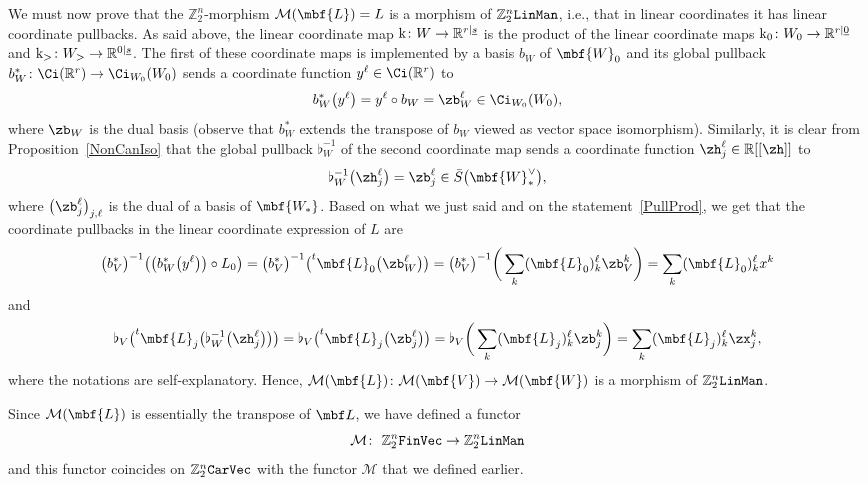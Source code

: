 \documentclass[10pt,a4paper]{amsart}
\newcommand{\rmk}{\textnormal{k}}
\newcommand{\R}{{\mathbb R}}
\newcommand{\Z}{{\mathbb Z}}
\def\ul{\underline}
\def\cM{\cal M}
\def\cM{\mathcal{M}}
\def\ul{\underline}
\newcommand{\0}{\otimes}
\numberwithin{equation}{section}
\providecommand{\cal}{\mathcal}
\begin{document}
We must now prove that the $\Z_2^n$-morphism $\cM(\mbf{L})=L$ is a morphism of $\Z_2^n\tt LinMan$, i.e., that in linear coordinates it has linear coordinate pullbacks. As said above, the linear coordinate map $\rmk\colon W\to\R^{r|\ul s}$ is the product of the linear coordinate maps $\rmk_0\colon W_0\to \R^{r|\ul 0}$ and $\rmk_>\colon W_>\to \R^{0|\ul s}$. The first of these coordinate maps is implemented by a basis $b_W$ of $\mbf{W}_0$ and its global pullback $b_W^*\colon \Ci(\R^r)\to \Ci_{W_0}(W_0)$ sends a coordinate function $y^\ell\in \Ci(\R^r)$ to
\[
b_W^*\big(y^\ell\big)=y^\ell\circ b_W=\zb_W^\ell\in\Ci_{W_0}(W_0),
\]
where $\zb_W$ is the dual basis (observe that $b^*_W$ extends the transpose of $b_W$ viewed as vector space isomorphism). Similarly, it is clear from Proposition~\ref{NonCanIso} that the global pullback $\flat_W^{-1}$ of the second coordinate map sends a coordinate function $\zh_j^\ell\in\R[[\zh]]$ to
\[
\flat^{-1}_W\big(\zh_j^\ell\big)=\zb_j^\ell\in\bar S\big(\mbf{W}^\vee_*\big),
\]
where $\big(\zb_j^\ell\big)_{j,\ell}$ is the dual of a basis of $\mbf{W_*}$. Based on what we just said and on the statement~\eqref{PullProd}, we get that the coordinate pullbacks in the linear coordinate expression of $L$ are
\[
\big(b^*_V\big)^{-1}\big(\big(b_W^*\big(y^\ell\big)\big)\circ L_0\big) =\big(b^*_V\big)^{-1}\big(^t\mbf{L}_0\big(\zb_W^{\ell}\big)\big)
=\big(b^*_V\big)^{-1}\bigg(\sum_k(\mbf{L}_0)^\ell_k\zb_V^k\bigg)
=\sum_k(\mbf{L}_0)^\ell_kx^k
\]
and \[
\flat_V\big(^t\mbf{L}_j\big(\flat_W^{-1}\big(\zh_j^{\ell}\big)\big)\big)
=\flat_V\big(^t\mbf{L}_j\big(\zb_j^{\ell}\big)\big) =\flat_V\bigg(\sum_k(\mbf{L}_j)^\ell_k\zb^k_j\bigg)=\sum_k(\mbf{L}_j)^\ell_k\zx_j^k,
\]
where the notations are self-explanatory. Hence, $\cM(\mbf{L})\colon \cM(\mbf{V})\to\cM(\mbf{W})$ is a morphism of $\Z_2^n\tt LinMan$.

Since $\cM(\mbf{L})$ is essentially the transpose of $\mbf L$, we have defined a functor
\[
\cM\colon\ \Z_2^n{\tt FinVec}\to\Z_2^n\tt LinMan
\]
and this functor coincides on $\Z_2^n\tt CarVec$ with the functor $\cM$ that we defined earlier.
\end{document}
